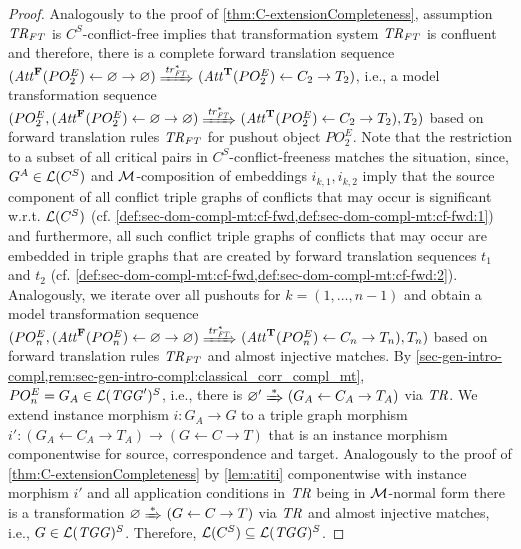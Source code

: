 \begin{proof}
Analogously to the proof of \cref{thm:C-extensionCompleteness}, assumption $\mathit{TR}_\mathit{FT}$ is $C^S$-conflict-free implies that transformation system $\mathit{TR}_\mathit{FT}$ is confluent and therefore, there is a complete forward translation sequence $(\Att^\False(PO^E_2) \gets \varnothing \to \varnothing) \Trans{\tr_\FT^*} (\Att^\True(PO^E_2) \gets C_2 \to T_2)$, i.e., a model transformation sequence $(PO^E_2,(\Att^\False(PO^E_2) \gets \varnothing \to \varnothing) \Trans{\tr_\FT^*} (\Att^\True(PO^E_2) \gets C_2 \to T_2),T_2)$ based on forward translation rules $\mathit{TR}_\mathit{FT}$ for pushout object $PO^E_2$.
Note that the restriction to a subset of all critical pairs in $C^S$-conflict-freeness matches the situation, since, $G^A \in \mathcal{L}(C^S)$ and ${\cal M}$-composition of embeddings $i_{k,1},i_{k,2}$ imply that the source component of all conflict triple graphs of conflicts that may occur is significant w.r.t. $\mathcal{L}(C^S)$ (cf. \cref{def:sec-dom-compl-mt:cf-fwd,def:sec-dom-compl-mt:cf-fwd:1}) and furthermore, all such conflict triple graphs of conflicts that may occur are embedded in triple graphs that are created by forward translation sequences $t_1$ and $t_2$ (cf. \cref{def:sec-dom-compl-mt:cf-fwd,def:sec-dom-compl-mt:cf-fwd:2}).
Analogously, we iterate over all pushouts for $k=(1,\ldots,n-1)$ and obtain a model transformation sequence $(PO^E_n,(\Att^\False(PO^E_n) \gets \varnothing \to \varnothing) \Trans{\tr_\FT^*} (\Att^\True(PO^E_n) \gets C_n \to T_n),T_n)$ based on forward translation rules $\mathit{TR}_\mathit{FT}$ and almost injective matches.
By \cref{sec-gen-intro-compl,rem:sec-gen-intro-compl:classical_corr_compl_mt}, $PO^E_n=G_A \in \mathcal{L}(\mathit{TGG}')^S$, i.e., there is $\varnothing' \Trans{*} (G_A \gets C_A \to T_A)$ via $\mathit{TR}$.
We extend instance morphism $i\colon G_A \to G$ to a triple graph morphism $i'\colon (G_A \gets C_A \to T_A) \to (G \gets C \to T)$ that is an instance morphism componentwise for source, correspondence and target.
Analogously to the proof of \cref{thm:C-extensionCompleteness} by \cref{lem:atiti} componentwise with instance morphism $i'$ and all application conditions in $\mathit{TR}$ being in ${\cal M}$-normal form there is a transformation $\varnothing \Trans{*} (G \gets C \to T)$ via $\mathit{TR}$ and almost injective matches, i.e., $G \in \mathcal{L}(\mathit{TGG})^S$.
Therefore, $\mathcal{L}(C^S) \subseteq \mathcal{L}(\mathit{TGG})^S$.
\end{proof}


